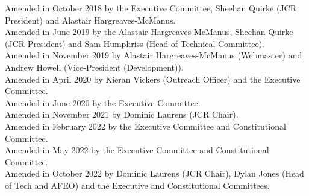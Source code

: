 \documentclass[12pt]{article}
\begin{document}
Amended in October 2018 by the Executive Committee, Sheehan Quirke (JCR President) and Alastair Hargreaves-McManus.\\
Amended in June 2019 by the Alastair Hargreaves-McManus, Sheehan Quirke (JCR President) and Sam Humphriss (Head of Technical Committee).\\
Amended in November 2019 by Alastair Hargreaves-McManus (Webmaster) and Andrew Howell (Vice-President (Development)).\\
Amended in April 2020 by Kieran Vickers (Outreach Officer) and the Executive Committee.\\
Amended in June 2020 by the Executive Committee.\\
Amended in November 2021 by Dominic Laurens (JCR Chair).\\
Amended in February 2022 by the Executive Committee and Constitutional Committee.\\
Amended in May 2022 by the Executive Committee and Constitutional Committee.\\
Amended in October 2022 by Dominic Laurens (JCR Chair), Dylan Jones (Head of Tech and AFEO) and the Executive and Constitutional Committees.

\newpage
\tableofcontents{}
\newpage
\end{document}
